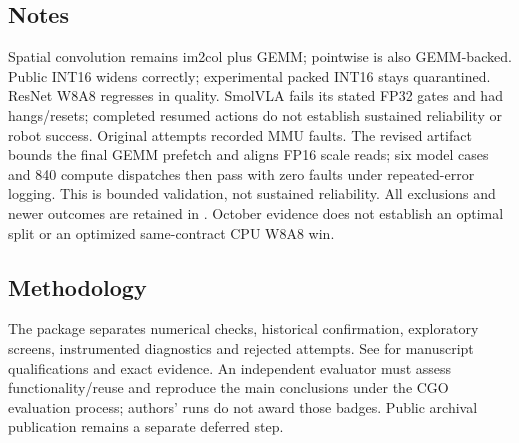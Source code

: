 \subsection{Notes}
Spatial convolution remains im2col plus GEMM; pointwise is also GEMM-backed.
Public INT16 widens correctly; experimental packed INT16 stays quarantined.
ResNet W8A8 regresses in quality. SmolVLA fails its stated FP32 gates and had
hangs/resets; completed resumed actions do not establish sustained reliability
or robot success. Original attempts recorded MMU faults. The revised artifact bounds the final
GEMM prefetch and aligns FP16 scale reads; six model cases and 840 compute
dispatches then pass with zero faults under repeated-error logging. This
is bounded validation, not sustained reliability. All exclusions and newer
outcomes are retained in . October evidence
does not establish an optimal split or an optimized same-contract CPU W8A8 win.

\subsection{Methodology}
The package separates numerical checks, historical confirmation, exploratory
screens, instrumented diagnostics and rejected attempts. See
 for manuscript qualifications and exact evidence.
An independent evaluator must assess functionality/reuse and reproduce the
main conclusions under the CGO evaluation process; authors' runs do not award
those badges. Public archival publication remains a separate deferred step.

\label{sec:artifact-appendix-end}
\endgroup
